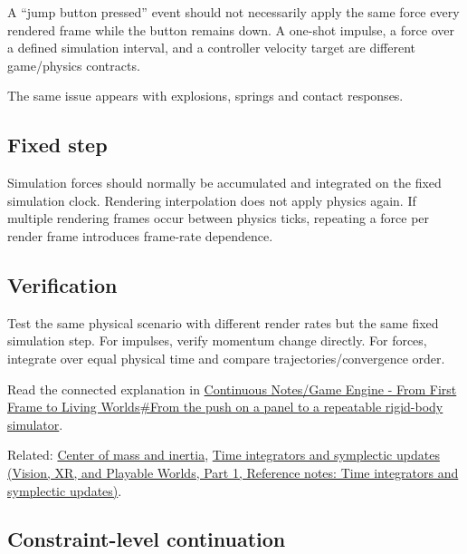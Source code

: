 \hypertarget{appendix-c39931e6e4c2-frame-event-versus-physical-force}{}

A ``jump button pressed'' event should not necessarily apply the same force every rendered frame while the button remains down. A one-shot impulse, a force over a defined simulation interval, and a controller velocity target are different game/physics contracts.

The same issue appears with explosions, springs and contact responses.

\subsection{Fixed step}\label{appendix-c39931e6e4c2-fixed-step}

\hypertarget{appendix-c39931e6e4c2-fixed-step}{}

Simulation forces should normally be accumulated and integrated on the fixed simulation clock. Rendering interpolation does not apply physics again. If multiple rendering frames occur between physics ticks, repeating a force per render frame introduces frame-rate dependence.

\subsection{Verification}\label{appendix-c39931e6e4c2-verification}

\hypertarget{appendix-c39931e6e4c2-verification}{}

Test the same physical scenario with different render rates but the same fixed simulation step. For impulses, verify momentum change directly. For forces, integrate over equal physical time and compare trajectories/convergence order.

Read the connected explanation in \hyperref[06-engine-ii-ch034-from-the-push-on-a-panel-to-a-repeatable-rigid-body-simulator]{Continuous Notes/Game Engine - From First Frame to Living Worlds\#From the push on a panel to a repeatable rigid-body simulator}.

Related: \hyperref[appendix-66742099f8a0]{Center of mass and inertia}, \href{../07-Vision-XR-and-Playable-Worlds-P01/main.pdf\#nameddest=appendix-8f96f9c4d5bc}{Time integrators and symplectic updates (Vision, XR, and Playable Worlds, Part 1, Reference notes: Time integrators and symplectic updates)}.

\subsection{Constraint-level continuation}\label{appendix-c39931e6e4c2-constraint-level-continuation}

